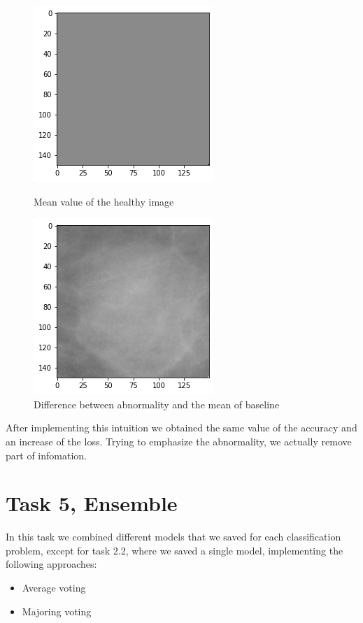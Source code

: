 \documentclass{article}
\begin{document}
\begin{figure}[H]
    \centering
    \begin{minipage}{0.45\textwidth}
        \centering
        \includegraphics[scale=0.56]{./img/baselineAvg.png}
	\caption{Mean value of the healthy image}
    \end{minipage}\hfill
    \begin{minipage}{0.45\textwidth}
        \centering
        \includegraphics[scale=0.56]{./img/diffBaseline.png}
\caption{Difference between abnormality and the mean of baseline}
    \end{minipage}
\end{figure}
After implementing this intuition we obtained the same value of the accuracy and an increase of the loss. Trying to emphasize the abnormality, we actually remove part of infomation.



\clearpage
\section{Task 5, Ensemble}
In this task we combined different models that we saved for each classification problem, except for task 2.2, where we saved a single model, implementing the following approaches:
\begin{itemize}
\item Average voting
\item Majoring voting
\end{itemize}
\end{document}
